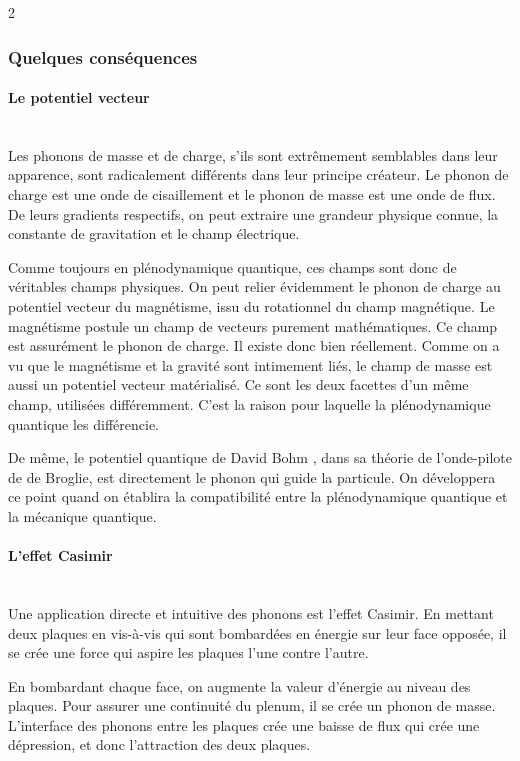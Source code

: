\begin{multicols}{2}
\subsubsection{ Quelques conséquences}

\paragraph{Le potentiel vecteur}~\\ 

Les phonons de masse et de charge, s'ils sont extrêmement semblables
dans leur apparence, sont radicalement différents dans leur principe
créateur. Le phonon de charge est une onde de cisaillement et le
phonon de masse est une onde de flux. De leurs gradients respectifs,
on peut extraire une grandeur physique connue, la constante de
gravitation et le champ électrique.

Comme toujours en plénodynamique quantique, ces champs sont donc de
véritables champs physiques. On peut relier évidemment le phonon de
charge au potentiel vecteur du magnétisme, issu du rotationnel du
champ magnétique. Le magnétisme postule un champ de vecteurs purement
mathématiques. Ce champ est assurément le phonon de charge. Il existe donc bien
réellement. Comme on a vu que le magnétisme et la gravité sont
intimement liés, le champ de masse est aussi un potentiel vecteur
matérialisé. Ce sont les deux facettes d'un même champ, utilisées
différemment. C'est la raison pour laquelle la plénodynamique
quantique les différencie.

De même, le potentiel quantique de David Bohm \cite{bohm1952suggested}, dans sa théorie de
l'onde-pilote de de Broglie, est directement le phonon qui guide la
particule. On développera ce point quand on établira la compatibilité
entre la plénodynamique quantique et la mécanique quantique.

\paragraph{L'effet Casimir}~\\

Une application directe et intuitive des phonons est l'effet Casimir.
En mettant deux plaques en vis-à-vis qui sont bombardées en énergie sur
leur face opposée, il se crée une force qui aspire les plaques l'une
contre l'autre.

En bombardant chaque face, on augmente la valeur d'énergie au niveau
des plaques. Pour assurer une continuité du plenum, il se crée un
phonon de masse. L'interface des phonons entre les plaques crée une
baisse de flux qui crée une dépression, et donc l'attraction des deux
plaques.


\end{multicols}
